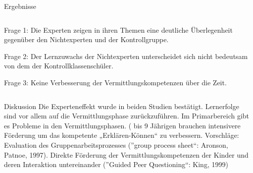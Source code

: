 \begin{alertblock}{Ergebnisse}
\begin{columns}[t,totalwidth=\twocolwid]
\begin{column}{\onecolwid}
\justifying
Frage 1: Die Experten zeigen in ihren Themen eine deutliche Überlegenheit gegenüber den Nichtexperten und der Kontrollgruppe.

Frage 2: Der Lernzuwachs der Nichtexperten unterscheidet sich nicht bedeutsam von dem der Kontrollklassenschüler.

Frage 3: Keine Verbesserung der Vermittlungskompetenzen über die Zeit.
\end{column}

\end{columns}
\end{alertblock}

\begin{block}{Diskussion}
Die Experteneffekt wurde in beiden Studien bestätigt. Lernerfolge sind vor allem auf die Vermittlungsphase zurückzuführen. Im Primarbereich gibt es Probleme in den Vermittlungsphasen. ( bis 9 Jährigen brauchen intensivere Förderung um das kompetente „Erklären-Können“ zu verbessern. Vorschläge: Evaluation des Gruppenarbeitsprozesses (''group process sheet``: Aronson, Patnoe, 1997). Direkte Förderung der Vermittlungskompetenzen der Kinder und deren Interaktion untereinander (''Guided Peer Questioning``: King, 1999)
\end{block}
